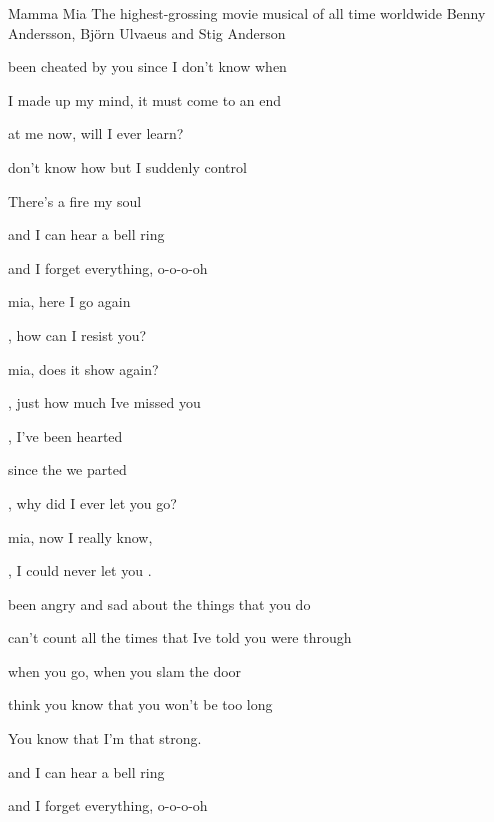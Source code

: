 \begin{SBSong}{Mamma Mia}
  {The highest-grossing movie musical of all time worldwide}
  {Benny Andersson, Bj\"orn Ulvaeus and Stig Anderson}
  \begin{SBVerse}
     been cheated by you since I don't know  when

     I made up my mind, it must come to an  end

     at me now, will I ever learn?

     don't know how but I suddenly  control

    There's a fire  my soul

       and I can hear a bell ring

       and I forget everything, o-o-o-oh
  \end{SBVerse}
  \begin{SBChorus}
     mia, here I go again

    , how can I resist you?

     mia, does it show again?

    , just how much Ive missed you

    , I've been  hearted

     since the  we parted

    , why did I ever let you go?

     mia, now I really know,

    , I could never let you .
  \end{SBChorus}
  \begin{SBVerse}
     been angry and sad about the things that you  do

     can't count all the times that Ive told you were  through

     when you go, when you slam the door

     think you know that you won't be  too long

    You know that I'm  that strong.

       and I can hear a bell ring

       and I forget everything, o-o-o-oh
  \end{SBVerse}
\end{SBSong}
